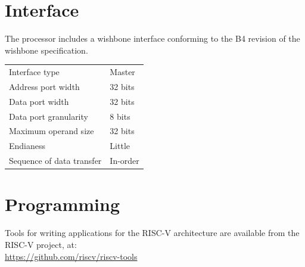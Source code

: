 \documentclass[10pt,a4paper]{article}
\begin{document}
\begin{minipage}[t]{0.48\textwidth}
\section{Interface}

The processor includes a wishbone interface conforming to the B4 revision of the
wishbone specification.\\

\begin{tabularx}{\textwidth}{|l|X|}
\hline
Interface type & Master \\
Address port width & 32 bits \\
Data port width & 32 bits \\
Data port granularity & 8 bits \\
Maximum operand size & 32 bits \\
Endianess & Little \\
Sequence of data transfer & In-order \\
\hline
\end{tabularx}

\section{Programming}

Tools for writing applications for the RISC-V architecture are available from the
RISC-V project, at:\\[1em]
\url{https://github.com/riscv/riscv-tools}\\

\end{minipage}\hfill
\end{document}

